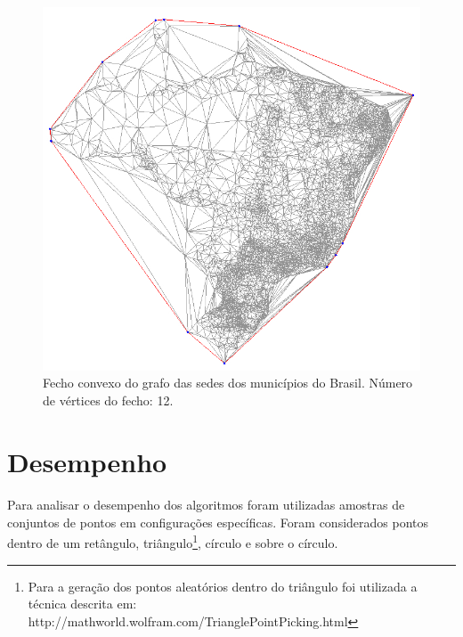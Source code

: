 \documentclass[11pt,a4paper]{article}
\begin{document}
        \begin{figure}[!htb]
          \begin{center}
              \includegraphics[scale=0.5]{brazil_ch}
          \end{center}
                \captionsetup{justification=centering,margin=2cm}
              \caption{Fecho convexo do grafo das sedes dos municípios do Brasil. Número de vértices do fecho: 12.}
              \label{fig:grafo2}
        \end{figure}


\clearpage
    \section{Desempenho}
    \paragraph{}
    Para analisar o desempenho dos algoritmos foram utilizadas amostras de conjuntos de pontos em configurações específicas. Foram considerados pontos dentro de um retângulo, triângulo\footnote{Para a geração dos pontos aleatórios dentro do triângulo foi utilizada a técnica descrita em: http://mathworld.wolfram.com/TrianglePointPicking.html}, círculo e sobre o círculo. 
\end{document}
